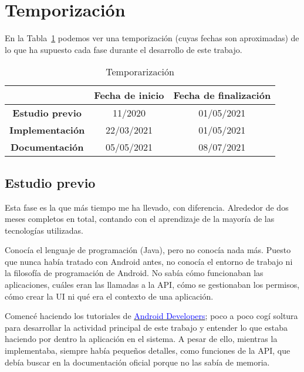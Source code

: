 \section{Temporización}

En la Tabla~\ref{tab:temp} podemos ver una temporización (cuyas fechas son aproximadas) de lo que ha supuesto cada fase durante el desarrollo de este trabajo.

\begin{table}[H]
\centering
\begin{tabular}{|c|c|c|}
\hline
                        & \textbf{Fecha de inicio} & \textbf{Fecha de finalización} \\ \hline
\textbf{Estudio previo} & 11/2020                  & 01/05/2021                               \\ \hline
\textbf{Implementación} & 22/03/2021               & 01/05/2021                     \\ \hline
\textbf{Documentación}  & 05/05/2021               & 08/07/2021                               \\ \hline
\end{tabular}
\caption{Temporarización}
\label{tab:temp}
\end{table}

\subsection{Estudio previo}

Esta fase es la que más tiempo me ha llevado, con diferencia. Alrededor de dos meses completos en total, contando con el aprendizaje de la mayoría de las tecnologías utilizadas.

Conocía el lenguaje de programación (Java), pero no conocía nada más. Puesto que nunca había tratado con Android antes, no conocía el entorno de trabajo ni la filosofía de programación de Android. No sabía cómo funcionaban las aplicaciones, cuáles eran las llamadas a la API, cómo se gestionaban los permisos, cómo crear la UI ni qué era el contexto de una aplicación.

Comencé haciendo los tutoriales de \href{https://developer.android.com/}{\textcolor{blue}{Android Developers}}; poco a poco cogí soltura para desarrollar la actividad principal de este trabajo y entender lo que estaba haciendo por dentro la aplicación en el sistema. A pesar de ello, mientras la implementaba, siempre había pequeños detalles, como funciones de la API, que debía buscar en la documentación oficial porque no las sabía de memoria.

